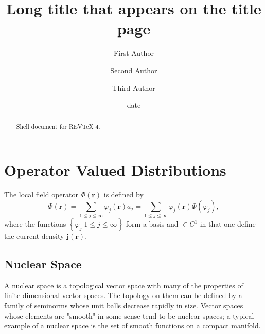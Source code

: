 \documentclass[aps,preprint]{revtex4}%
\begin{document}
\title[Short title for running header]{Long title that appears on the title page}
\author{First Author}
\author{Second Author}
\author{Third Author}

\begin{abstract}
Shell document for REV\TeX{} 4.

\end{abstract}
\date[Date text]{date}




\maketitle
\tableofcontents


\section{Operator Valued Distributions}

The local field operator $\Phi\left(  \mathbf{r}\right)  $ is defined by
\begin{equation}
\Phi\left(  \mathbf{r}\right)  =\sum_{1\leq j\leq\infty}\varphi_{j}\left(
\mathbf{r}\right)  a_{j}=\sum_{1\leq j\leq\infty}\varphi_{j}\left(
\mathbf{r}\right)  \Phi\left(  \varphi_{j}\right)  ,
\end{equation}
where the functions $\left\{  \left.  \varphi_{j}\right\vert 1\leq j\leq
\infty\right\}  $ form a basis and $\in C^{1}$ in that one define the current
density $\mathbf{j}\left(  \mathbf{r}\right)  $.

\subsection{Nuclear Space}

A nuclear space is a topological vector space with many of the properties of
finite-dimensional vector spaces. The topology on them can be defined by a
family of seminorms whose unit balls decrease rapidly in size. Vector spaces
whose elements are "smooth" in some sense tend to be nuclear spaces; a typical
example of a nuclear space is the set of smooth functions on a compact manifold.
\end{document}
